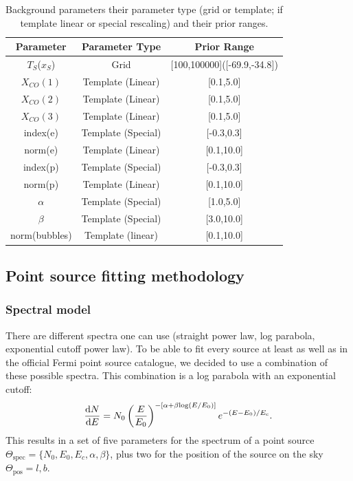 \documentclass{article}
\begin{document}
\begin{table}[htbp]
\centering
\fontsize{9}{9}\selectfont
\begin{tabular}{|c|c|c|}
\hline
Parameter & Parameter Type & Prior Range \\
\hline
\hline
$T_S$($x_S$) & Grid & [100,100000]([-69.9,-34.8]) \\
\hline
$X_{CO}(1)$ & Template (Linear) & [0.1,5.0] \\
\hline
$X_{CO}(2)$ & Template (Linear) & [0.1,5.0] \\
\hline
$X_{CO}(3)$ & Template (Linear) & [0.1,5.0] \\
\hline
index(e) & Template (Special) & [-0.3,0.3] \\
\hline
norm(e) & Template (Linear) & [0.1,10.0] \\
\hline
index(p) & Template (Special) & [-0.3,0.3] \\
\hline
norm(p) & Template (Linear) & [0.1,10.0] \\
\hline
$\alpha$ & Template (Special) & [1.0,5.0] \\
\hline
$\beta$ & Template (Special) & [3.0,10.0] \\
\hline
norm(bubbles) & Template (linear) & [0.1,10.0] \\
\hline
\end{tabular}
\caption{\fontsize{9}{9}\selectfont  Background parameters their parameter type (grid or template; if template linear or special rescaling) and their prior ranges.} \label{BG_params}
\end{table}

\subsection{Point source fitting methodology}

\subsubsection{Spectral model}

There are different spectra one can use (straight power law, log parabola, exponential cutoff power law). To be able to fit every source at least as well as in the official Fermi point source catalogue, we decided to use a combination of these possible spectra.  This combination is a log parabola with an exponential cutoff:
\begin{equation*}
\frac{\textnormal{d}N}{\textnormal{d}E} = N_0 \left( \frac{E}{E_0} \right)^{-\left[\alpha + \beta \textnormal{log}(E/E_0)\right]} e^{-(E-E_0)/E_\mathrm{c}}.
\end{equation*}
This results in a set of five parameters for the spectrum of a point source $\Theta_\mathrm{spec} = \{ N_0,E_0,E_c,\alpha,\beta\}$, plus two for the position of the source on the sky $\Theta_\mathrm{pos} = l, b$.
\end{document}
